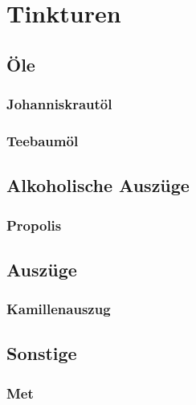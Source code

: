 \chapter{Tinkturen}

\section{Öle}

\subsection{Johanniskrautöl}

\subsection{Teebaumöl}

\section{Alkoholische Auszüge}

\subsection{Propolis}

\section{Auszüge}

\subsection{Kamillenauszug}

\section{Sonstige}

\subsection{Met}
